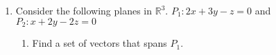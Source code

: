 \documentclass[12pt]{article}
\begin{document}
\begin{enumerate}
\begin{enumerate}
                            \paragraph{Answer: Yes, $k_{1}\vec{p1} + k_{2}\vec{p2} + k_{3}\vec{p3} = \vec{0}$}
                            \begin{proof}
                                    From part (b) we have                                     \begin{align*}
                                            \begin{bmatrix}
                                                    2 & 1  & 3 & \bigm| & 0 \\
                                                    1 & -1 & 2 & \bigm| & 0 \\
                                                    4 & 3  & 5 & \bigm| & 0 \\
                                            \end{bmatrix}
                                            =
                                            \begin{bmatrix}
                                                    1 & 0 & 0 & \bigm| & 0 \\
                                                    0 & 1 & 0 & \bigm| & 0 \\
                                                    0 & 0 & 1 & \bigm| & 0 \\
                                            \end{bmatrix}
                                    \end{align*}
                                    Therefore $(k_{1}, k_{2}, k_{3}) = (0,0,0)$ so $\{\vec{p_{1}}, \vec{p_{2}}, \vec{p_{3}}\}$ is linearly independent
                            \end{proof}
                            \pagebreak
              \end{enumerate}
        \item Consider the following planes in $\mathbb{R}^3$. $P_1: 2x + 3y - z = 0$ and $P_2: x + 2y - 2z = 0$
              \begin{enumerate}
                      \item Find a set of vectors that spans $P_1$.

\end{enumerate}
\end{enumerate}
\end{document}
